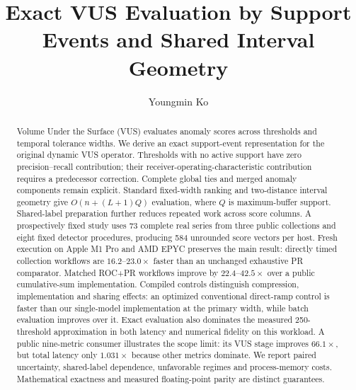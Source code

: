 \documentclass[sigconf,nonacm]{acmart}
\begin{document}
\title{Exact VUS Evaluation by Support Events and Shared Interval Geometry}
\author{Youngmin Ko}
\begin{abstract}
Volume Under the Surface (VUS) evaluates anomaly scores across thresholds and temporal tolerance widths. We derive an exact support-event representation for the original dynamic VUS operator. Thresholds with no active support have zero precision--recall contribution; their receiver-operating-characteristic contribution requires a predecessor correction. Complete global ties and merged anomaly components remain explicit. Standard fixed-width ranking and two-distance interval geometry give $O(n+(L+1)Q)$ evaluation, where $Q$ is maximum-buffer support. Shared-label preparation further reduces repeated work across score columns. A prospectively fixed study uses 73 complete real series from three public collections and eight fixed detector procedures, producing 584 unrounded score vectors per host. Fresh execution on Apple M1 Pro and AMD EPYC preserves the main result: directly timed collection workflows are $16.2$--$23.0\times$ faster than an unchanged exhaustive PR comparator. Matched ROC+PR workflows improve by $22.4$--$42.5\times$ over a public cumulative-sum implementation. Compiled controls distinguish compression, implementation and sharing effects: an optimized conventional direct-ramp control is faster than our single-model implementation at the primary width, while batch evaluation improves over it. Exact evaluation also dominates the measured 250-threshold approximation in both latency and numerical fidelity on this workload. A public nine-metric consumer illustrates the scope limit: its VUS stage improves $66.1\times$, but total latency only $1.031\times$ because other metrics dominate. We report paired uncertainty, shared-label dependence, unfavorable regimes and process-memory costs. Mathematical exactness and measured floating-point parity are distinct guarantees.
\end{abstract}
\maketitle
\vldbtopmatter



\end{document}
